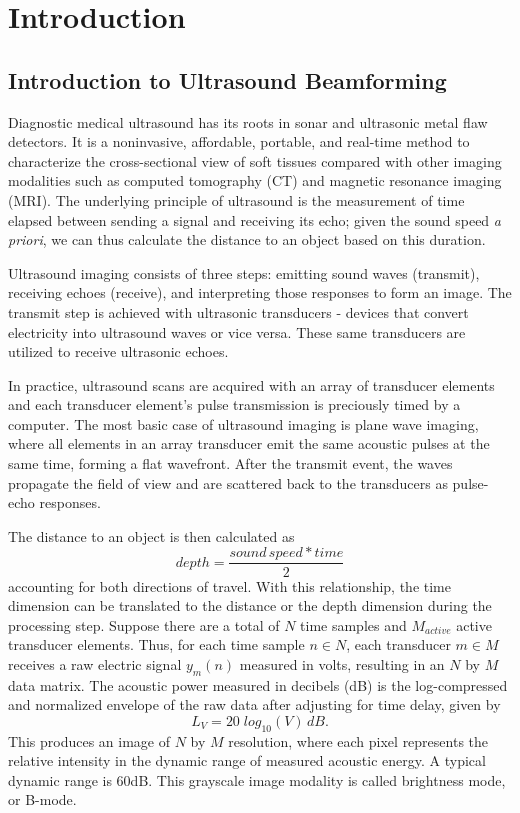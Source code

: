 \chapter{Introduction}


\section{Introduction to Ultrasound Beamforming}
 Diagnostic medical ultrasound has its roots in sonar and ultrasonic metal flaw detectors. It is a noninvasive, affordable, portable, and real-time method to characterize the cross-sectional view of soft tissues compared with other imaging modalities such as computed tomography (CT) and magnetic resonance imaging (MRI). The underlying principle of ultrasound is the measurement of time elapsed between sending a signal and receiving its echo; given the sound speed \textit{a priori}, we can thus calculate the distance to an object based on this duration.

 Ultrasound imaging consists of three steps: emitting sound waves (transmit), receiving echoes (receive), and interpreting those responses to form an image. The transmit step is achieved with ultrasonic transducers - devices that convert electricity into ultrasound waves or vice versa. These same transducers are utilized to receive ultrasonic echoes.

 In practice, ultrasound scans are acquired with an array of transducer elements and each transducer element's pulse transmission is preciously timed by a computer. The most basic case of ultrasound imaging is plane wave imaging, where all elements in an array transducer emit the same acoustic pulses at the same time, forming a flat wavefront. After the transmit event, the waves propagate the field of view and are scattered back to the transducers as pulse-echo responses.



 The distance to an object is then calculated as
 $$depth = \frac{sound\,speed * time}{2}$$ %
 accounting for both directions of travel. With this relationship, the time dimension can be translated to the distance or the depth dimension during the processing step. Suppose there are a total of $N$ time samples and $M_{active}$ active transducer elements. Thus, for each time sample $n \in N$, each transducer $m \in M$ receives a raw electric signal $y_{m}(n)$ measured in volts, resulting in an $N$ by $M$ data matrix. The acoustic power measured in decibels (dB) is the log-compressed and normalized envelope of the raw data after adjusting for time delay, given by
 $$
 L_{V} = 20\;log_{10}(V)\,dB.
 $$
 This produces an image of $N$ by $M$ resolution, where each pixel represents the relative intensity in the dynamic range of measured acoustic energy. A typical dynamic range is 60dB. This grayscale image modality is called brightness mode, or B-mode.

